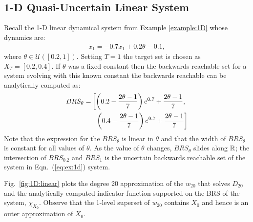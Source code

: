 \subsection{1-D Quasi-Uncertain Linear System}
Recall the 1-D linear dynamical system from Example \ref{example:1D} whose dynamics are:
  \begin{align}
	\dot x_1 = -0.7x_1+0.2\theta-0.1,
\label{eq:ex:1d}
\end{align}
where $\theta\in \mathcal U([0.2,1])$.
Setting $T = 1$ the target set is chosen as $X_T=[0.2,0.4]$.
If $\theta$ was a fixed constant then the backwards reachable set for a system evolving with this known constant the backwards reachable can be analytically computed as:
\begin{align}
	\begin{aligned}
  		BRS_\theta=&\left[\left(0.2-\frac{2\theta-1}{7}\right)e^{0.7}+\frac{2\theta-1}{7}, \right. \\
					&\hspace*{0.2cm}\left.\left(0.4-\frac{2\theta-1}{7}\right)e^{0.7}+\frac{2\theta-1}{7}\right]
	\end{aligned}
\end{align}
\normalsize
Note that the expression for the $BRS_\theta$ is linear in $\theta$ and that the width of $BRS_\theta$ is constant for all values of $\theta$.
As the value of $\theta$ changes, $BRS_\theta$ slides along $\mathbb{R}$; the intersection of $BRS_{0.2}$ and $BRS_1$ is the uncertain backwards reachable set of the system in Eqn.~(\ref{eq:ex:1d}) system.
\par
Fig.~\ref{fig:1D:linear} plots the degree 20 approximation of the $w_{20}$ that solves $D_{20}$ and the analytically computed indicator function supported on the BRS of the system, $\chi_{X_0}$. Observe that the 1-level superset of $w_{20}$ contains $X_{0}$ and hence is an outer approximation of $X_0$.
